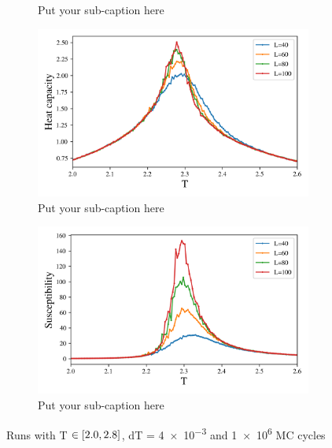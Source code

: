\begin{figure}[ht]
\begin{subfigure}[t]{.5\textwidth}
    \caption{Put your sub-caption here}
    \label{fig:sub-second}
  \end{subfigure}
  \hfill
  \newline
  \begin{subfigure}[t]{.5\textwidth}
    \centering
    \includegraphics[width=\linewidth]{../figures/phase_cv.png}
    \caption{Put your sub-caption here}
    \label{fig:sub-second}
  \end{subfigure}
  \begin{subfigure}[t]{.5\textwidth}
    \centering
    \includegraphics[width=\linewidth]{../figures/phase_suscept.png}
    \caption{Put your sub-caption here}
    \label{fig:sub-second}
  \end{subfigure}
\caption{Runs with T $\in \left[2.0,2.8\right]$, dT = \num{4e-3} and
\num{1e6} MC cycles}
\label{fig:fig}
\end{figure}



